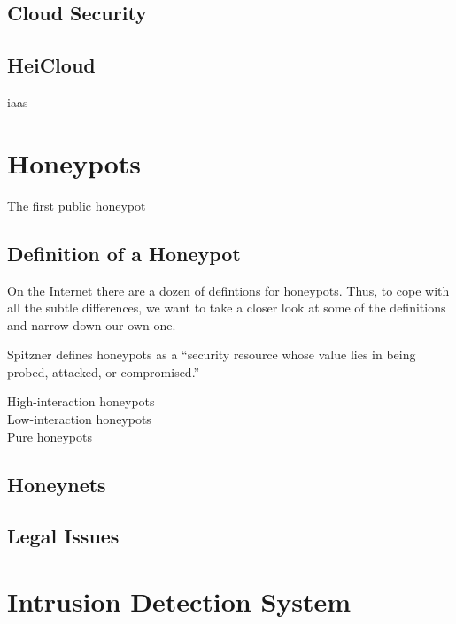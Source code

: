 \subsection{Cloud Security}

\cite{Nithin2012}

\subsection{HeiCloud}

\ac{iaas}

\section{Honeypots}

The first public honeypot \cite{Spitzner2003}

\subsection{Definition of a Honeypot}

On the Internet there are a dozen of defintions for honeypots. Thus, to cope with all the subtle differences, we want to take a closer look at some of the definitions and narrow down our own one.

Spitzner defines honeypots as a \enquote{security resource whose value lies in being probed, attacked, or compromised.}\cite{Spitzner2003}

High-interaction honeypots\\

Low-interaction honeypots\\

Pure honeypots\\



\subsection{Honeynets}

\cite{Spitzner2003}

\subsection{Legal Issues}

\cite{Spitzner2003}

\section{Intrusion Detection System}

